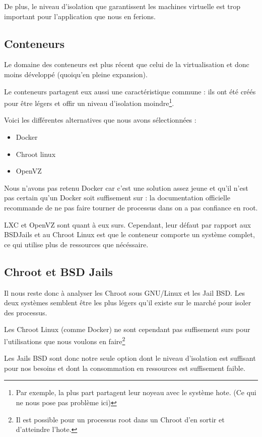 \documentclass[10pt,a4paper]{article}
\begin{document}
De plus, le niveau d'isolation que garantissent les machines virtuelle est trop important pour l'application que nous en ferions.

\subsection{Conteneurs}
Le domaine des conteneurs est plus récent que celui de la virtualisation et donc moins développé (quoiqu'en pleine expansion).

Le conteneurs partagent eux aussi une caractéristique commune : ils ont été créés pour être légers et offir un niveau d'isolation moindre\footnote{Par exemple, la plus part partagent leur noyeau avec le système hote. (Ce qui ne nous pose pas problème ici)}.

Voici les différentes alternatives que nous avons sélectionnées :

\begin{itemize}
    \item{Docker}
    \item{Chroot linux}
    \item{OpenVZ}
\end{itemize}

Nous n'avons pas retenu Docker car c'est une solution assez jeune et qu'il n'est pas certain qu'un Docker soit suffisement sur : la documentation officielle recommande de ne pas faire tourner de processus dans on a pas confiance en root.

LXC et OpenVZ sont quant à eux surs. Cependant, leur défaut par rapport aux BSDJails et au Chroot Linux est que le conteneur comporte un système complet, ce qui utilise plus de ressources que nécéssaire.

\subsection{Chroot et BSD Jails}

Il nous reste donc à analyser les Chroot sous GNU/Linux et les Jail BSD. Les deux systèmes semblent être les plus légers qu'il existe sur le marché pour isoler des processus.


Les Chroot Linux (comme Docker) ne sont cependant pas suffisement surs pour l'utilisations que nous voulons en faire\footnote{Il est possible pour un processus root dans un Chroot d'en sortir et d'atteindre l'hote.}

Les Jails BSD sont donc notre seule option dont le niveau d'isolation est suffisant pour nos besoins et dont la consommation en ressources est suffisement faible.
\end{document}
